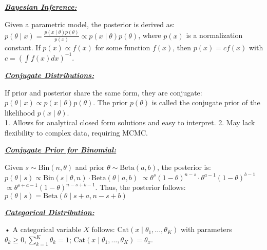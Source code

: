 \documentclass[10pt]{article}
\newcommand{\bulletPoint}[1]{\ul{\textit{\textbf{#1}}}}
\begin{document}
\begin{multicols*}{3}
\begin{itemize}[label=$\cdot$,leftmargin=0pt]
\end{itemize}


\bulletPoint{Bayesian Inference:} \quad

Given a parametric model, the posterior is derived as: $p(\theta \mid x) = \frac{p(x \mid \theta) p(\theta)}{p(x)} \propto p(x \mid \theta) p(\theta)$,
where $p(x)$ is a normalization constant.
If $p(x) \propto f(x)$ for some function $f(x)$, then $p(x) = c f(x)$ with 
$c = \left( \int f(x) dx \right)^{-1}$.

\bulletPoint{Conjugate Distributions:} \quad

If prior and posterior share the same form, they are conjugate:
$p(\theta \mid x) \propto p(x \mid \theta) p(\theta)$.
The prior $p(\theta)$ is called the conjugate prior of the likelihood $p(x \mid \theta)$.\\
1. Allows for analytical closed form solutions and easy to interpret. 
2. May lack flexibility to complex data, requiring MCMC.


\bulletPoint{Conjugate Prior for Binomial:} \quad

Given $s \sim \text{Bin}(n, \theta)$ and prior $\theta \sim \text{Beta}(a, b)$, the posterior is:
$p(\theta \mid s) \propto \text{Bin}(s \mid \theta, n) \cdot \text{Beta}(\theta \mid a, b)$
$\propto \theta^s (1 - \theta)^{n-s} \cdot \theta^{a-1} (1 - \theta)^{b-1}$
$\propto \theta^{s+a-1} (1 - \theta)^{n-s+b-1}$. 
Thus, the posterior follows:
$p(\theta \mid s) = \text{Beta}(\theta \mid s + a, n - s + b)$

\bulletPoint{Categorical Distribution:} \quad

• A categorical variable $X$ follows:
$\text{Cat} (x \mid \theta_1, \dots, \theta_K)$ with parameters $\theta_k \geq 0, \sum_{k=1}^{K} \theta_k = 1$;
$\text{Cat} (x \mid \theta_1, \dots, \theta_K)=\theta_x$.


\end{multicols*}
\end{document}
